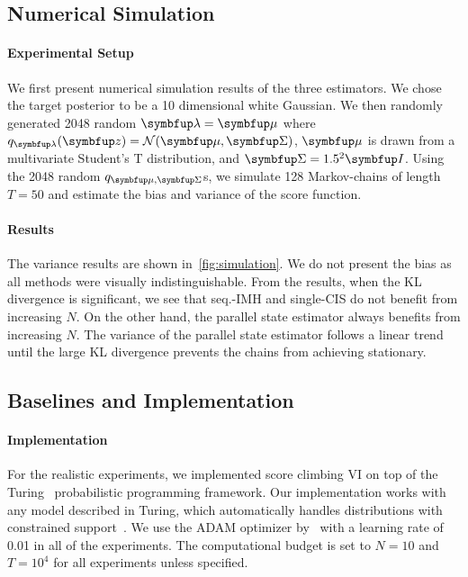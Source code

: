 \subsection{Numerical Simulation}\label{section:simulation}
\vspace{-0.05in}
\paragraph{Experimental Setup}
We first present numerical simulation results of the three estimators.
We chose the target posterior to be a 10 dimensional white Gaussian.
We then randomly generated 2048 random \(\vlambda = \vmu\) where \(q_{\vlambda}(\vz) = \mathcal{N}(\vmu, \mSigma)\), \(\vmu\) is drawn from a multivariate Student's T distribution, and \(\mSigma = 1.5^2 \mI\).
Using the 2048 random \(q_{\vmu, \mSigma}\)s, we simulate 128 Markov-chains of length \(T=50\) and estimate the bias and variance of the score function.

\vspace{-0.05in}
\paragraph{Results}
The variance results are shown in~\cref{fig:simulation}.
We do not present the bias as all methods were visually indistinguishable.
From the results, when the KL divergence is significant, we see that seq.-IMH and single-CIS do not benefit from increasing \(N\).
On the other hand, the parallel state estimator always benefits from increasing \(N\).
The variance of the parallel state estimator follows a linear trend until the large KL divergence prevents the chains from achieving stationary.


\vspace{-0.05in}
\subsection{Baselines and Implementation}
\vspace{-0.05in}
\paragraph{Implementation}
For the realistic experiments, we implemented score climbing VI on top of the Turing~\citep{ge2018t} probabilistic programming framework.
Our implementation works with any model described in Turing, which automatically handles distributions with constrained support~\citep{JMLR:v18:16-107}.
We use the ADAM optimizer by~\citet{kingma_adam_2015} with a learning rate of 0.01 in all of the experiments.
The computational budget is set to \(N=10\) and \(T=10^4\) for all experiments unless specified.

